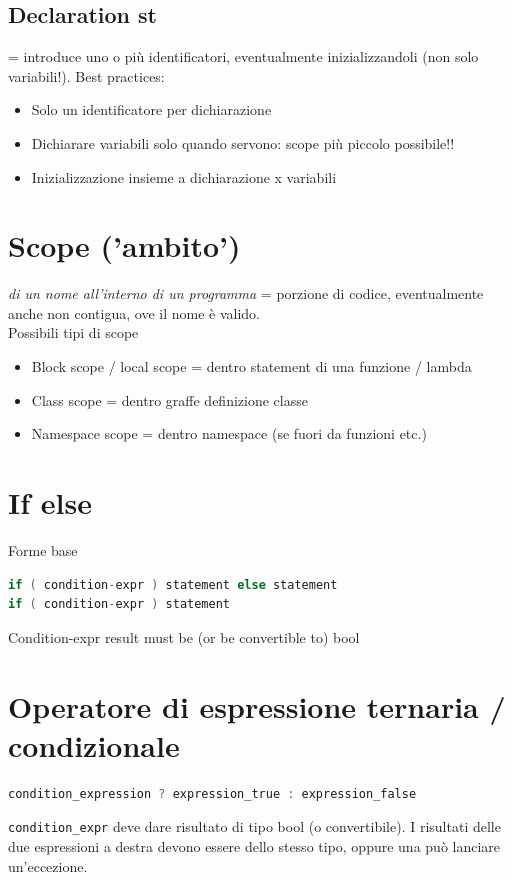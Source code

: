 \documentclass[10pt, oneside]{book}
\begin{document}
\subsection{Declaration st}
= introduce uno o più identificatori, eventualmente inizializzandoli (non solo variabili!). Best practices:
\begin{itemize}
\item Solo un identificatore per dichiarazione
\item Dichiarare variabili solo quando servono: scope più piccolo possibile!!
\item Inizializzazione insieme a dichiarazione x variabili
\end{itemize}

\section{Scope ('ambito')}
\textit{di un nome all'interno di un programma} = porzione di codice, eventualmente anche non contigua, ove il nome è valido. \\
Possibili tipi di scope
\begin{itemize}
\item Block scope / local scope = dentro statement di una funzione / lambda
\item Class scope = dentro graffe definizione classe
\item Namespace scope = dentro namespace (se fuori da funzioni etc.)
\end{itemize}

\section{If else}
Forme base
\begin{lstlisting}[language=C++]
if ( condition-expr ) statement else statement
if ( condition-expr ) statement
\end{lstlisting}
Condition-expr result must be (or be convertible to) bool

\section{Operatore di espressione ternaria / condizionale}
\begin{lstlisting}[language=C++]
condition_expression ? expression_true : expression_false
\end{lstlisting}
\texttt{condition\_expr} deve dare risultato di tipo bool (o convertibile). I risultati delle due espressioni a destra devono essere dello stesso tipo, oppure una può lanciare un'eccezione.
\end{document}
